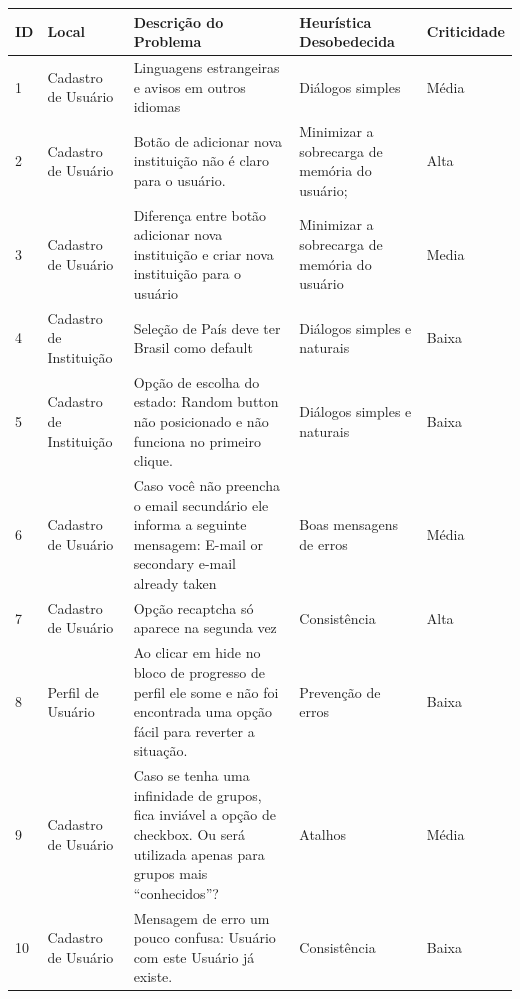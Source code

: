 \begin{table}[h!]
\label{table_1a}
\begin{tabular}{|l|p{3cm}|p{6cm}|p{3cm}|l|}
\hline
\textbf{ID} & \textbf{Local} & \textbf{Descrição do Problema}                                                                                     & \textbf{Heurística Desobedecida} & \textbf{Criticidade} \\ \hline
1           & Cadastro de Usuário                 & Linguagens estrangeiras e avisos em outros idiomas & Diálogos simples  & Média                \\ \hline
2           & Cadastro de Usuário      & Botão de adicionar nova instituição não é claro para o usuário.  & Minimizar a sobrecarga de memória do usuário;           & Alta                \\ \hline
3           & Cadastro de Usuário               & Diferença entre botão adicionar nova instituição e criar nova instituição para o usuário  & Minimizar a sobrecarga de memória do usuário & Media                \\ \hline
4           & Cadastro de Instituição             & Seleção de País deve ter Brasil como default  & Diálogos simples e naturais    & Baixa                \\ \hline
5           & Cadastro de Instituição      & Opção de escolha do estado: Random button não posicionado e não funciona no primeiro clique. & Diálogos simples e naturais  & Baixa                \\ \hline
6           & Cadastro de Usuário  & Caso você não preencha o email secundário ele informa a seguinte mensagem: E-mail or secondary e-mail already taken & Boas mensagens de erros                & Média                \\ \hline
7           & Cadastro de Usuário  & Opção recaptcha só aparece na segunda vez & Consistência                     & Alta                \\ \hline
8           & Perfil de Usuário  & Ao clicar em hide no bloco de progresso de perfil ele some e não foi encontrada uma opção fácil para reverter a situação.
 & Prevenção de erros                     & Baixa                \\ \hline
9           & Cadastro de Usuário  & Caso se tenha uma infinidade de grupos, fica inviável a opção de checkbox. Ou será utilizada apenas para grupos mais ``conhecidos''? & Atalhos & Média                \\ \hline
10           & Cadastro de Usuário  & Mensagem de erro um pouco confusa: Usuário com este Usuário já existe.  & Consistência                     & Baixa                \\ \hline
\end{tabular}
\end{table}

